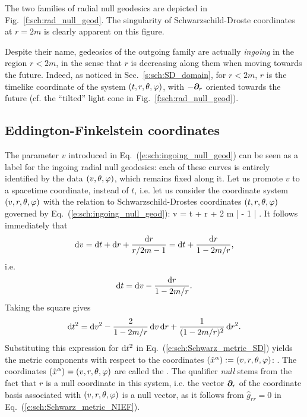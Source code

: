 The two families of radial null geodesics are depicted in
Fig.~\ref{f:sch:rad_null_geod}.
The singularity of Schwarzschild-Droste coordinates at $r=2m$
is clearly apparent on this figure.


\begin{remark}
Despite their name, gedeosics of the outgoing family are actually
\emph{ingoing} in the region $r<2m$, in the sense that
$r$ is decreasing along them when moving towards the future. Indeed,
as noticed in Sec.~\ref{s:sch:SD_domain},
for $r<2m$, $r$ is the timelike coordinate of the system $(t,r,\theta,\varphi)$,
with $-\bm{\partial}_r$ oriented towards the future (cf. the ``tilted'' light cone
in Fig.~\ref{f:sch:rad_null_geod}).
\end{remark}

\subsection{Eddington-Finkelstein coordinates} \label{s:sch:EF_coord}

The parameter $v$ introduced in Eq.~(\ref{e:sch:ingoing_null_geod}) can be
seen as a label for the ingoing radial null geodesics: each of these curves is
entirely identified by the data $(v,\theta,\varphi)$, which remains fixed along it.
Let us promote $v$ to a spacetime coordinate, instead of $t$, i.e. let us
consider the coordinate system $(v,r,\theta,\varphi)$ with the relation to
Schwarzschild-Drostes coordinates $(t,r,\theta,\varphi)$ governed by Eq.~(\ref{e:sch:ingoing_null_geod}):
\be \label{e:sch:v_t_r}
     v = t + r + 2 m \ln \left|  - 1 \right| .
\ee
It follows immediately that
\[
    \mathrm{d} v = \mathrm{d} t + \mathrm{d} r + \frac{\mathrm{d} r}{r/2m - 1} = \mathrm{d} t + \frac{\mathrm{d} r}{1 - 2m/r} ,
\]
i.e.
\[
    \mathrm{d} t = \mathrm{d} v -  \frac{\mathrm{d} r}{1 - 2m/r} .
\]
Taking the square gives
\[
    \mathrm{d} t^2 = \mathrm{d} v^2 - \frac{2}{1 - 2m/r} \, \mathrm{d} v \, \mathrm{d} r + \frac{1}{(1 - 2m/r)^2}\, \mathrm{d} r^2 .
\]
Substituting this expression for $\mathrm{d} t^2$ in Eq.~(\ref{e:sch:Schwarz_metric_SD})
yields the metric components with respect to the coordinates
$({\hat x}^\alpha) := (v,r,\theta,\varphi)$:
\be \label{e:sch:Schwarz_metric_NIEF}
    .
\ee
The coordinates $({\hat x}^\alpha) = (v,r,\theta,\varphi)$ are called the
. The qualifier \emph{null} stems from the fact that
$r$ is a null coordinate in this system, i.e. the vector $\bm{\partial}_r$ of the coordinate
basis associated with $(v,r,\theta,\varphi)$ is a null
vector, as it follows from ${\hat g}_{rr}=0$ in Eq.~(\ref{e:sch:Schwarz_metric_NIEF}).

